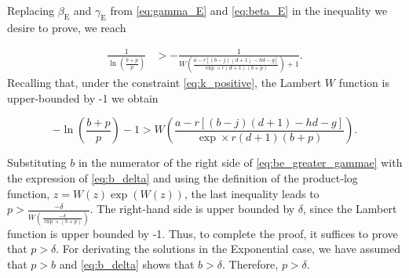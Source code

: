 \documentclass[twocolumn,english]{IEEEtran}
\theoremstyle{plain}
\theoremstyle{definition}
\begin{document}
\label{subsec:ff3}Replacing $\beta_{\textrm{E}}$ and $\gamma_{\text{E}}$
from \eqref{eq:gamma_E} and \eqref{eq:beta_E} in the inequality
we desire to prove, we reach

\noindent 
\begin{align}
\frac{1}{\ln\left(\frac{b+p}{p}\right)} & >-\frac{1}{W\left(\frac{a-r\left[\left(b-j\right)\left(d+1\right)-hd-g\right]}{\exp\times r\left(d+1\right)\left(b+p\right)}\right)+1}.
\end{align}
Recalling that, under the constraint \eqref{eq:k_positive}, the Lambert
$W$ function is upper-bounded by -1 we obtain

\noindent 
\begin{equation}
-\ln\left(\frac{b+p}{p}\right)-1>W\left(\frac{a-r\left[\left(b-j\right)\left(d+1\right)-hd-g\right]}{\exp\times r\left(d+1\right)\left(b+p\right)}\right).\label{eq:be_greater_gammae}
\end{equation}


\noindent Substituting $b$ in the numerator of the right side of
\eqref{eq:be_greater_gammae} with the expression of \eqref{eq:b_delta}
and using the definition of the product-log function, $z=W\left(z\right)\exp\left(W\left(z\right)\right)$,
the last inequality leads to $p>\frac{-\delta}{W\left(\frac{-\delta}{\exp\times(b+p)}\right)}$.
The right-hand side is upper bounded by $\delta$, since the Lambert
function is upper bounded by -1. Thus, to complete the proof, it suffices
to prove that $p>\delta$. For derivating the solutions in the Exponential
case, we have assumed that $p>b$ and \eqref{eq:b_delta} shows that
$b>\delta$. Therefore, $p>\delta$.{} 

\balance
\end{document}
